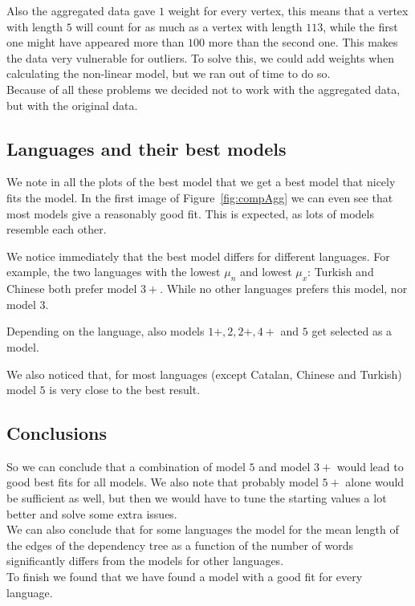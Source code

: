 \documentclass[paper=a4, fontsize=11pt]{scrartcl} %
\begin{document}
Also the aggregated data gave $1$ weight for every vertex, this means that a vertex with length $5$ will count for as much as a vertex with length $113$, while the first one might have appeared more than $100$ more than the second one. This makes the data very vulnerable for outliers. To solve this, we could add weights when calculating the non-linear model, but we ran out of time to do so.\\

Because of all these problems we decided not to work with the aggregated data, but with the original data.

\subsection{Languages and their best models}
We note in all the plots of the best model that we get a best model that nicely fits the model. In the first image of Figure~\ref{fig:compAgg} we can even see that most models give a reasonably good fit. This is expected, as lots of models resemble each other.

We notice immediately that the best model differs for different languages. For example, the two languages with the lowest $\mu_{n}$ and lowest $\mu_{x}$: Turkish and Chinese both prefer model $3+$. While no other languages prefers this model, nor model $3$.

Depending on the language, also models $1+,2,2+,4+$ and $5$ get selected as a model.

We also noticed that, for most languages (except Catalan, Chinese and Turkish) model $5$ is very close to the best result.

\subsection{Conclusions}
So we can conclude that a combination of model $5$ and model $3+$ would lead to good best fits for all models. We also note that probably model $5+$ alone would be sufficient as well, but then we would have to tune the starting values a lot better and solve some extra issues.\\

We can also conclude that for some languages the model for the mean length of the edges of the dependency tree as a function of the number of words significantly differs from the models for other languages.\\

To finish we found that we have found a model with a good fit for every language.
\end{document}
